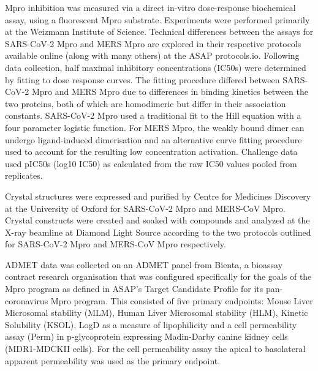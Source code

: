 \documentclass[journal=jcim,manuscript=article]{achemso}
\begin{document}
Mpro inhibition was measured via a direct in-vitro dose-response biochemical assay, using a fluorescent Mpro substrate. Experiments were performed primarily at the Weizmann Institute of Science. Technical differences between the assays for SARS-CoV-2 Mpro\cite{sars_mpro_dose_response_protocol} and MERS Mpro\cite{mers_mpro_dose_response_protocol} are explored in their respective protocols available online (along with many others) at the ASAP protocols.io\cite{asap_protocols_io}. Following data collection, half maximal inhibitory concentrations (IC50s) were determined by fitting to dose response curves. The fitting procedure differed between SARS-CoV-2 Mpro and MERS Mpro due to differences in binding kinetics between the two proteins, both of which are homodimeric but differ in their association constants. SARS-CoV-2 Mpro used a traditional fit to the Hill equation with a four parameter logistic function. For MERS Mpro, the weakly bound dimer can undergo ligand-induced dimerisation and an alternative curve fitting procedure used to account for the resulting low concentration activation. Challenge data used pIC50s (log10 IC50) as calculated from the raw IC50 values pooled from replicates. 

Crystal structures were expressed and purified by Centre for Medicines Discovery at the University of Oxford for SARS-CoV-2 Mpro and  MERS-CoV Mpro. Crystal constructs were created and soaked with compounds and analyzed at the X-ray beamline at Diamond Light Source according to the two protocols outlined for SARS-CoV-2 Mpro\cite{sars_mpro_crystal_protocol} and MERS-CoV Mpro respectively\cite{mers_mpro_crystal_protocol}. 

ADMET data was collected on an ADMET panel from Bienta, a bioassay contract research organisation that was configured specifically for the goals of the Mpro program as defined in ASAP’s Target Candidate Profile\cite{sars_mers_tcp} for its pan-coronavirus Mpro program. This consisted of five primary endpoints: Mouse Liver Microsomal stability (MLM), Human Liver Microsomal stability (HLM)\cite{hlm_mlm_assay_protcol}, Kinetic Solubility (KSOL)\cite{ksol_assay_protocol}, LogD as a measure of lipophilicity\cite{logD_assay_protocol} and a cell permeability assay (Perm) in p-glycoprotein expressing Madin-Darby canine kidney cells (MDR1-MDCKII cells)\cite{perm_assay_protocol}.  For the cell permeability assay the apical to basolateral apparent permeability was used as the primary endpoint.
\end{document}
